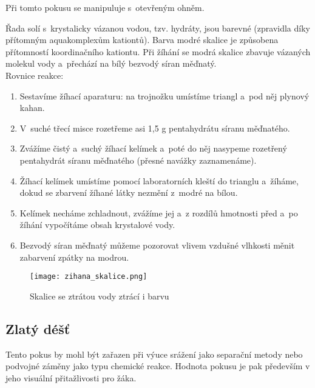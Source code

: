 \hspace{-21pt} 

Při tomto pokusu se manipuluje s~otevřeným ohněm.\\

\hspace{-21pt} 

Řada solí s~krystalicky vázanou vodou, tzv. hydráty, jsou barevné (zpravidla díky přítomným aquakomplexům kationtů). Barva modré skalice je způsobena přítomností koordinačního kationtu. Při žíhání se modrá skalice zbavuje vázaných molekul vody a~přechází na bílý bezvodý síran měďnatý.\\

Rovnice reakce: \\

\hspace{-21pt} 

\begin{enumerate}
  \item Sestavíme žíhací aparaturu: na trojnožku umístíme triangl a~pod něj plynový kahan.
  \item V~suché třecí misce rozetřeme asi 1,5 g pentahydrátu síranu měďnatého.
  \item Zvážíme čistý a~suchý žíhací kelímek a~poté do něj nasypeme rozetřený pentahydrát síranu měďnatého (přesné navážky zaznamenáme).
  \item Žíhací kelímek umístíme pomocí laboratorních kleští do trianglu a~žíháme, dokud se zbarvení žíhané látky nezmění z~modré na bílou.
  \item Kelímek necháme zchladnout, zvážíme jej a~z rozdílů hmotnosti před a~po žíhání vypočítáme obsah krystalové vody.
  \item Bezvodý síran měďnatý můžeme pozorovat vlivem vzdušné vlhkosti měnit zabarvení zpátky na modrou.
\end{enumerate}

\begin{figure}[h]
    \centering
    \texttt{[image: zihana\_skalice.png]}
    \caption{Skalice se ztrátou vody ztrácí i barvu}
\end{figure}

\subsection{Zlatý déšť}


Tento pokus by mohl být zařazen při výuce srážení jako separační metody nebo podvojné záměny jako typu chemické reakce. Hodnota pokusu je pak především v jeho visuální přitažlivosti pro žáka.\\

